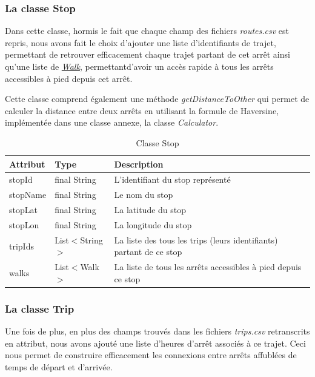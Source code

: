 \documentclass[12pt]{article}
\begin{document}
\subsubsection{La classe Stop}
\label{sec:stop}
Dans cette classe, hormis le fait que chaque champ des fichiers \emph{routes.csv} est repris, nous avons fait le choix d'ajouter
une liste d'identifiants de trajet, permettant de retrouver efficacement chaque trajet partant de cet arrêt ainsi qu'une liste de \hyperref[sec:walk]{\emph{Walk}}, permettantd'avoir un accès rapide à tous les arrêts accessibles à pied depuis cet arrêt.

Cette classe comprend également une méthode \emph{getDistanceToOther} qui permet de calculer la distance entre deux arrêts en utilisant la formule de Haversine,
implémentée dans une classe annexe, la classe \emph{Calculator}.

\begin{table}[h]
    \centering
    \begin{tabular}{|l|l|p{8cm}|}
    \hline
    \textbf{Attribut} & \textbf{Type} & \textbf{Description} \\
    \hline
    stopId & final String & L'identifiant du stop représenté \\
    stopName & final String & Le nom du stop \\
    stopLat & final String & La latitude du stop \\
    stopLon & final String & La longitude du stop \\
    tripIds & List$<$String$>$ & La liste des tous les trips (leurs identifiants) partant de ce stop \\
    walks & List$<$Walk$>$ & La liste de tous les arrêts accessibles à pied depuis ce stop \\
    \hline
    \end{tabular}
    \caption{Classe Stop}
\end{table}

\subsubsection{La classe Trip}
\label{sec:trip}
Une fois de plus, en plus des champs trouvés dans les fichiers \emph{trips.csv} retranscrits en attribut, nous avons ajouté
une liste d'heures d'arrêt associés à ce trajet. Ceci nous permet de construire efficacement les connexions entre arrêts affublées
de temps de départ et d'arrivée.
\end{document}
